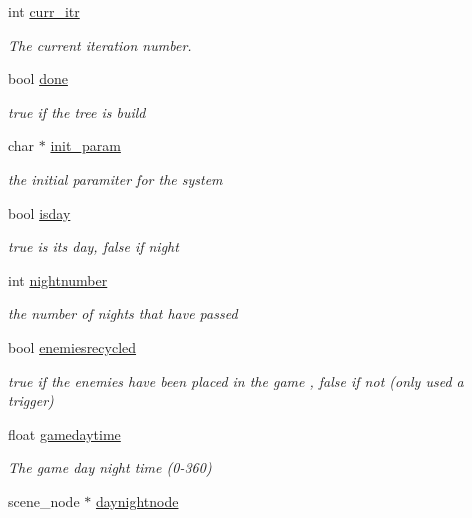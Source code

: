 \begin{DoxyCompactItemize}
int \hyperlink{classoctet_1_1_maths___l___systems_a320a9278ae12e7bed6714027ea64a334}{curr\+\_\+itr}
\begin{DoxyCompactList}\small\item\em The current iteration number. \end{DoxyCompactList}\item 
bool \hyperlink{classoctet_1_1_maths___l___systems_ab9e326a382610ba6088d52a966ec4d9e}{done}
\begin{DoxyCompactList}\small\item\em true if the tree is build \end{DoxyCompactList}\item 
char $\ast$ \hyperlink{classoctet_1_1_maths___l___systems_aec92a84b2e6a408ffe7bdf34ce3285e4}{init\+\_\+param}
\begin{DoxyCompactList}\small\item\em the initial paramiter for the system \end{DoxyCompactList}\item 
bool \hyperlink{classoctet_1_1_maths___l___systems_a656e4a1c5ecad3857ed35fa9b7d27a53}{isday}
\begin{DoxyCompactList}\small\item\em true is its day, false if night \end{DoxyCompactList}\item 
int \hyperlink{classoctet_1_1_maths___l___systems_a1b1840ca480629312bfa309681d6913c}{nightnumber}
\begin{DoxyCompactList}\small\item\em the number of nights that have passed \end{DoxyCompactList}\item 
bool \hyperlink{classoctet_1_1_maths___l___systems_a247062240824f418a425518fdc0d7e58}{enemiesrecycled}
\begin{DoxyCompactList}\small\item\em true if the enemies have been placed in the game , false if not (only used a trigger) \end{DoxyCompactList}\item 
float \hyperlink{classoctet_1_1_maths___l___systems_a6afebf4038c4d8b798e7e35d2b0a9652}{gamedaytime}
\begin{DoxyCompactList}\small\item\em The game day night time (0-\/360) \end{DoxyCompactList}\item 
scene\+\_\+node $\ast$ \hyperlink{classoctet_1_1_maths___l___systems_afdbae311939cba356a0d6fc5c39d1a66}{daynightnode}

\end{DoxyCompactItemize}

